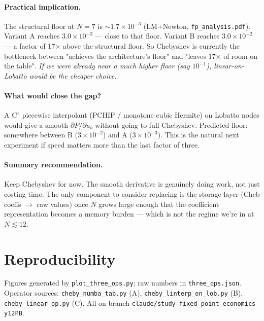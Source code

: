 \documentclass[11pt]{article}
\begin{document}
\paragraph{Practical implication.} The structural floor at $N{=}7$ is
$\sim 1.7\!\times\!10^{-3}$ (LM+Newton, \texttt{fp\_analysis.pdf}).
Variant A reaches $3.0\!\times\!10^{-3}$ --- close to that floor.
Variant B reaches $3.0\!\times\!10^{-2}$ --- a factor of 17$\times$
above the structural floor. So Chebyshev is currently the bottleneck
between "achieves the architecture's floor" and "leaves 17$\times$ of
room on the table". \emph{If we were already near a much higher floor
(say $10^{-1}$), linear-on-Lobatto would be the cheaper choice.}

\paragraph{What would close the gap?} A C$^1$ piecewise interpolant
(PCHIP / monotone cubic Hermite) on Lobatto nodes would give a smooth
$\partial P/\partial u_b$ without going to full Chebyshev. Predicted
floor: somewhere between B ($3\!\times\!10^{-2}$) and A
($3\!\times\!10^{-3}$). This is the natural next experiment if speed
matters more than the last factor of three.

\paragraph{Summary recommendation.} Keep Chebyshev for now. The smooth
derivative is genuinely doing work, not just costing time. The only
component to consider replacing is the storage layer (Cheb coeffs $\to$
raw values) once $N$ grows large enough that the coefficient
representation becomes a memory burden --- which is not the regime
we're in at $N \lesssim 12$.

\section*{Reproducibility}

Figures generated by \texttt{plot\_three\_ops.py}; raw numbers in
\texttt{three\_ops.json}. Operator sources:
\texttt{cheby\_numba\_tab.py} (A), \texttt{cheby\_linterp\_on\_lob.py}
(B), \texttt{cheby\_linear\_op.py} (C). All on branch
\texttt{claude/study-fixed-point-economics-y12PB}.
\end{document}
